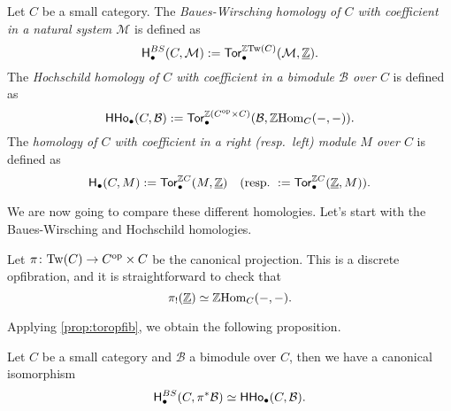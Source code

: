 \documentclass{amsart}
\newcommand{\M}{\mathcal{M}}
\newcommand{\B}{\mathcal{B}}
\newcommand{\Tw}[1]{\mathrm{Tw}(#1)}
\newcommand{\HHo}{\mathsf{HHo}}
\renewcommand{\homset}[3]{\mathrm{Hom}_{#1}(#2,#3)}
\begin{document}
\begin{definition}
  Let $C$ be a small category. The \emph{Baues-Wirsching homology of
    $C$ with coefficient in a natural system $\M$} is defined as
  \[
    \Ho^{BS}_{\bullet}(C,\M):=\Tor{\Z \Tw{C}}{\bullet}(\M,\cst{\Z}).
  \]
  The \emph{Hochschild homology of $C$ with coefficient in a bimodule
    $\B$ over $C$} is defined as
  \[
    \HHo_{\bullet}(C,\B):=\Tor{\Z (C^{\op}\times C)}{\bullet}(\B,\Z \homset{C}{-}{-}).
  \]
  The \emph{homology of $C$ with coefficient in a right (resp.\ 
    left) module $M$ over $C$} is defined as
  \[
    \mathsf{H}_{\bullet}(C,M):=\mathsf{Tor}^{\mathbb Z C}_{\bullet}(M,\underline{\mathbb Z})\quad (\text{resp.\
    } :=\mathsf{Tor}^{\mathbb Z C}_{\bullet}(\underline{\mathbb Z},M) ).
  \]
\end{definition}

We are now going to compare these different homologies. Let's start
with the Baues-Wirsching and Hochschild homologies.

\begin{paragr}
  Let $\pi \colon \Tw{C} \to C^{\op}\times C$ be the canonical
  projection. This is a discrete opfibration, and it is
  straightforward to check that
  \[
    \pi_!(\cst{\Z})\simeq \Z\homset{C}{-}{-}.
  \]
\end{paragr}
Applying \cref{prop:toropfib}, we obtain the following proposition.
\begin{proposition}
  Let $C$ be a small category and $\B$ a bimodule over $C$, then we
  have a canonical isomorphism
  \[
    \Ho_{\bullet}^{BS}(C,\pi^*\B)\simeq \HHo_{\bullet}(C,\B).
  \]
\end{proposition}
\end{document}
